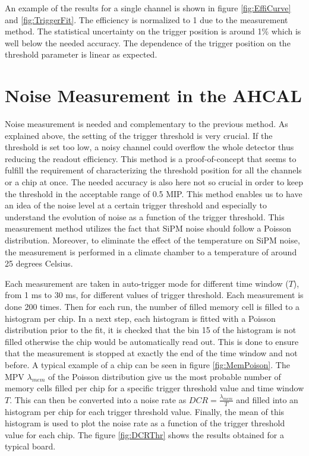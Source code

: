 An example of the results for a single channel is shown in figure \ref{fig:EffiCurve} and \ref{fig:TriggerFit}. The efficiency is normalized to 1 due to the measurement method. The statistical uncertainty on the trigger position is around 1\% which is well below the needed accuracy. The dependence of the trigger position on the threshold parameter is linear as expected.

\section{Noise Measurement in the AHCAL}

Noise measurement is needed and complementary to the previous method. As explained above, the setting of the trigger threshold is very crucial. If the threshold is set too low, a noisy channel could overflow the whole detector thus reducing the readout efficiency. This method is a proof-of-concept that seems to fulfill the requirement of characterizing the threshold position for all the channels or a chip at once. The needed accuracy is also here not so crucial in order to keep the threshold in the acceptable range of 0.5 MIP. This method enables us to have an idea of the noise level at a certain trigger threshold and especially to understand the evolution of noise as a function of the trigger threshold. This measurement method utilizes the fact that SiPM noise should follow a Poisson distribution. Moreover, to eliminate the effect of the temperature on SiPM noise, the measurement is performed in a climate chamber to a temperature of around 25 degrees Celsius.

Each measurement are taken in auto-trigger mode for different time window ($T$), from 1 ms to 30 ms, for different values of trigger threshold. Each measurement is done 200 times. Then for each run, the number of filled memory cell is filled to a histogram per chip. In a next step, each histogram is fitted with a Poisson distribution prior to the fit, it is checked that the bin 15 of the histogram is not filled otherwise the chip would be automatically read out. This is done to ensure that the measurement is stopped at exactly the end of the time window and not before. A typical example of a chip can be seen in figure \ref{fig:MemPoison}. The MPV $\lambda_{mem}$ of the Poisson distribution give us the most probable number of memory cells filled per chip for a specific trigger threshold value and time window $T$. This can then be converted into a noise rate as $DCR = \frac{\lambda_{mem}}{T}$ and filled into an histogram per chip for each trigger threshold value. Finally, the mean of this histogram is used to plot the noise rate as a function of the trigger threshold value for each chip. The figure \ref{fig:DCRThr} shows the results obtained for a typical board.

